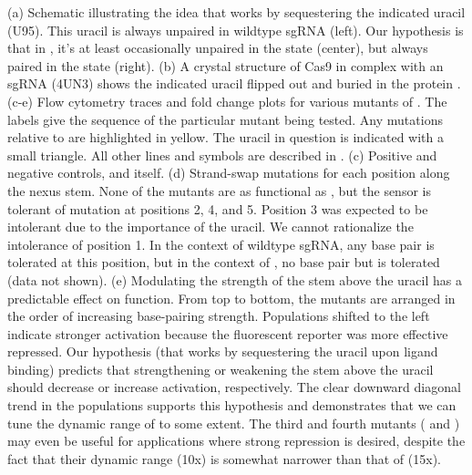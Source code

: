 \documentclass[10pt,oneside]{article}
\begin{document}
    (a) Schematic illustrating the idea that \ligrnaB{} works by sequestering the indicated uracil (U95).  This uracil is always unpaired in wildtype sgRNA (left).  Our hypothesis is that in \ligrnaB{}, it's at least occasionally unpaired in the \apo{} state (center), but always paired in the \holo{} state (right).
    (b) A crystal structure of Cas9 in complex with an sgRNA (4UN3) shows the indicated uracil flipped out and buried in the protein \autocite{nishimasu2014}.
    (c-e) Flow cytometry traces and fold change plots for various mutants of \ligrnaB{}.  The labels give the sequence of the particular mutant being tested.  Any mutations relative to \ligrnaB{} are highlighted in yellow.  The uracil in question is indicated with a small triangle.  All other lines and symbols are described in .
    (c) Positive and negative controls, and \ligrnaB{} itself.
    (d) Strand-swap mutations for each position along the nexus stem.  None of the mutants are as functional as \ligrnaB{}, but the sensor is tolerant of mutation at positions 2, 4, and 5.  Position 3 was expected to be intolerant due to the importance of the uracil.  We cannot rationalize the intolerance of position 1.  In the context of wildtype sgRNA, any base pair is tolerated at this position, but in the context of \ligrnaB{}, no base pair but  is tolerated (data not shown).
    (e) Modulating the strength of the stem above the uracil has a predictable effect on function.  From top to bottom, the mutants are arranged in the order of increasing base-pairing strength.  Populations shifted to the left indicate stronger activation because the fluorescent reporter was more effective repressed.  Our hypothesis (that \ligrnaB{} works by sequestering the uracil upon ligand binding) predicts that strengthening or weakening the stem above the uracil should decrease or increase activation, respectively.  The clear downward diagonal trend in the populations supports this hypothesis and demonstrates that we can tune the dynamic range of \ligrnaB{} to some extent.  The third and fourth mutants ( and ) may even be useful for applications where strong repression is desired, despite the fact that their dynamic range (10x) is somewhat narrower than that of \ligrnaB{} (15x).


\end{document}
